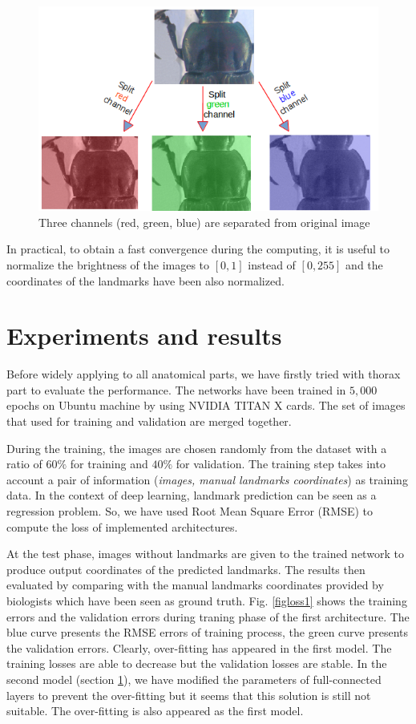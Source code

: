 \begin{figure}[h]
	\centering
	\includegraphics[scale=0.5]{images/sp_channels}
	\caption{Three channels (red, green, blue) are separated from original image}
	\label{figaug2}
\end{figure}

In practical, to obtain a fast convergence during the computing, it is useful to normalize the brightness of the images to $[0,1]$ instead of $[0, 255]$ and the coordinates of the landmarks have been also normalized. 
\section{Experiments and results}
Before widely applying to all anatomical parts, we have firstly tried with thorax part to evaluate the performance. The networks have been trained in $5, 000$ epochs on Ubuntu machine by using NVIDIA TITAN X cards. The set of images that used for training and validation are merged together. 

During the training, the images are chosen randomly from the dataset with a ratio of $60\%$ for training and $40\%$ for validation. The training step takes into account a pair of information (\textit{images, manual landmarks coordinates})  as training data. In the context of deep learning, landmark prediction can be seen as a regression problem. So, we have used Root Mean Square Error (RMSE) to compute the loss of implemented architectures.

At the test phase, images without landmarks are given to the trained network to produce output coordinates of the predicted landmarks. The results then evaluated by comparing with the manual landmarks coordinates provided by biologists which have been seen as ground truth. Fig. \ref{figloss1} shows the training errors and the validation errors during traning phase of the first architecture. The blue curve presents the RMSE errors of training process, the green curve presents the validation errors. Clearly, over-fitting has appeared in the first model. The training losses are able to decrease but the validation losses are stable. In the second model (section \ref{}), we have modified the parameters of full-connected layers to prevent the over-fitting but it seems that this solution is still not suitable. The over-fitting is also appeared as the first model.

